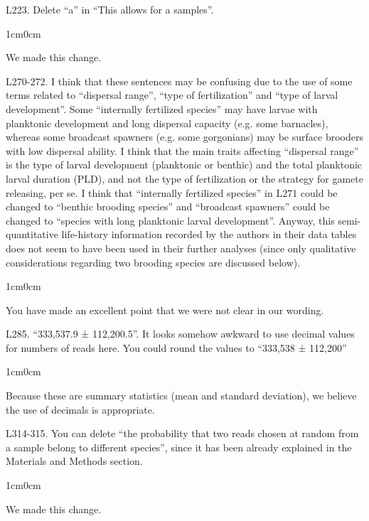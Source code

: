 \documentclass{article}
\newenvironment{response}
	{
	\begin{adjustwidth}{1cm}{0cm}
	\itshape %
	}
	{
	\end{adjustwidth}
	}
\begin{document}
L223. Delete ``a'' in ``This allows for a samples''.
\begin{response}
  We made this change.\\
\end{response}

L270-272. I think that these sentences may be confusing due to the use of some terms related to ``dispersal range'', ``type of fertilization'' and ``type of larval development''. Some ``internally fertilized species'' may have larvae with planktonic development and long dispersal capacity (e.g. some barnacles), whereas some broadcast spawners (e.g. some gorgonians) may be surface brooders with low dispersal ability. I think that the main traits affecting ``dispersal range'' is the type of larval development (planktonic or benthic) and the total planktonic larval duration (PLD), and not the type of fertilization or the strategy for gamete releasing, per se. I think that ``internally fertilized species'' in L271 could be changed to ``benthic brooding species'' and ``broadcast spawners'' could be changed to ``species with long planktonic larval development''. Anyway, this semi-quantitative life-history information recorded by the authors in their data tables does not seem to have been used in their further analyses (since only qualitative considerations regarding two brooding species are discussed below).
\begin{response}
  You have made an excellent point that we were not clear in our wording. \\
\end{response}

L285. ``333,537.9 ± 112,200.5''. It looks somehow awkward to use decimal values for numbers of reads here. You could round the values to ``333,538 ± 112,200''
\begin{response}
  Because these are summary statistics (mean and standard deviation), we believe the use of decimals is appropriate.\\
\end{response}

L314-315. You can delete ``the probability that two reads chosen at random from a sample belong to different species'', since it has been already explained in the Materials and Methods section.
\begin{response}
  We made this change.\\
\end{response}
\end{document}
